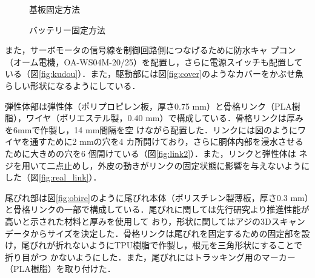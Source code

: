 \begin{figure}[t]
    \centering
    \begin{minipage}[b]{0.30\linewidth}
        \centering
        \caption{基板固定方法}
        \label{fig:toubu_kiban}
    \end{minipage}
    \hspace{0.05\linewidth}
    \begin{minipage}[b]{0.30\linewidth}
        \centering
        \caption{バッテリー固定方法}
        \label{fig:toubu_battery}
    \end{minipage}
\end{figure}
また，サーボモータの信号線を制御回路側につなげるために防水キャ
プコン（オーム電機，OA-WS04M-20/25）を配置し，さらに電源スイッチも配置している（図\ref{fig:kudou}）．また，駆動部には図\ref{fig:cover}のようなカバーをかぶせ魚らしい形状になるようにしている．

弾性体部は弾性体（ポリプロピレン板，厚さ0.75 mm）と骨格リンク（PLA樹脂），ワイヤ（ポリエステル製，0.40 mm）で構成している．骨格リンクは厚みを6mmで作製し，14 mm間隔を空
けながら配置した．リンクには図のようにワイヤを通すために2 mmの穴を4 カ所開けており，さらに胴体内部を浸水させるために大きめの穴を6 個開けている（図\ref{fig:link2}）．また，リンクと弾性体は
ネジを用いて二点止めし，外皮の動きがリンクの固定状態に影響を与えないようにした（図\ref{fig:real_link}）．

尾びれ部は図\ref{fig:obire}のように尾びれ本体（ポリスチレン製薄板，厚さ0.3 mm）と骨格リンクの一部で構成している．尾びれに関しては先行研究\cite{ni}より推進性能が高いと示された材料と厚みを使用して
おり，形状に関してはアジの3Dスキャンデータからサイズを決定した．骨格リンクは尾びれを固定するための固定部を設け，尾びれが折れないようにTPU樹脂で作製し，根元を三角形状にすることで折り目がつ
かないようにした．また，尾びれにはトラッキング用のマーカー（PLA樹脂）を取り付けた．

